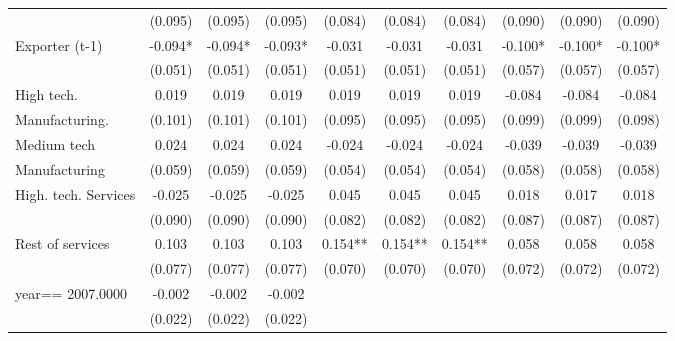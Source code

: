 \begin{table}[htbp]
\begin{tabular}{l*{9}{c}}
                    &     (0.095)   &     (0.095)   &     (0.095)   &     (0.084)   &     (0.084)   &     (0.084)   &     (0.090)   &     (0.090)   &     (0.090)   \\
Exporter (t-1)      &      -0.094*  &      -0.094*  &      -0.093*  &      -0.031   &      -0.031   &      -0.031   &      -0.100*  &      -0.100*  &      -0.100*  \\
                    &     (0.051)   &     (0.051)   &     (0.051)   &     (0.051)   &     (0.051)   &     (0.051)   &     (0.057)   &     (0.057)   &     (0.057)   \\
High tech.          &       0.019   &       0.019   &       0.019   &       0.019   &       0.019   &       0.019   &      -0.084   &      -0.084   &      -0.084   \\
Manufacturing.      &     (0.101)   &     (0.101)   &     (0.101)   &     (0.095)   &     (0.095)   &     (0.095)   &     (0.099)   &     (0.099)   &     (0.098)   \\
Medium tech         &       0.024   &       0.024   &       0.024   &      -0.024   &      -0.024   &      -0.024   &      -0.039   &      -0.039   &      -0.039   \\
Manufacturing       &     (0.059)   &     (0.059)   &     (0.059)   &     (0.054)   &     (0.054)   &     (0.054)   &     (0.058)   &     (0.058)   &     (0.058)   \\
High. tech. Services&      -0.025   &      -0.025   &      -0.025   &       0.045   &       0.045   &       0.045   &       0.018   &       0.017   &       0.018   \\
                    &     (0.090)   &     (0.090)   &     (0.090)   &     (0.082)   &     (0.082)   &     (0.082)   &     (0.087)   &     (0.087)   &     (0.087)   \\
Rest of services    &       0.103   &       0.103   &       0.103   &       0.154** &       0.154** &       0.154** &       0.058   &       0.058   &       0.058   \\
                    &     (0.077)   &     (0.077)   &     (0.077)   &     (0.070)   &     (0.070)   &     (0.070)   &     (0.072)   &     (0.072)   &     (0.072)   \\
year==  2007.0000   &      -0.002   &      -0.002   &      -0.002   &               &               &               &               &               &               \\
                    &     (0.022)   &     (0.022)   &     (0.022)   &               &               &               &               &               &               \\

\end{tabular}
\end{table}
